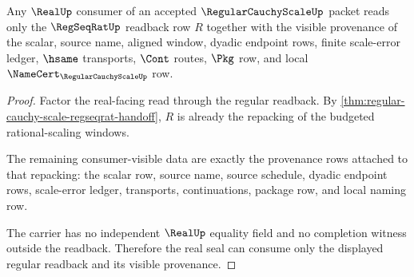 \begin{theorem}
\label{thm:regular-cauchy-scale-realup-seal-boundary}
Any $\RealUp$ consumer of an accepted $\RegularCauchyScaleUp$ packet reads only the $\RegSeqRatUp$ readback row $R$ together with the visible provenance of the scalar, source name, aligned window, dyadic endpoint rows, finite scale-error ledger, $\hsame$ transports, $\Cont$ routes, $\Pkg$ row, and local $\NameCert_{\RegularCauchyScaleUp}$ row.
\end{theorem}
\begin{proof}
Factor the real-facing read through the regular readback. By \autoref{thm:regular-cauchy-scale-regseqrat-handoff}, $R$ is already the repacking of the budgeted rational-scaling windows.

The remaining consumer-visible data are exactly the provenance rows attached to that repacking: the scalar row, source name, source schedule, dyadic endpoint rows, scale-error ledger, transports, continuations, package row, and local naming row.

The carrier has no independent $\RealUp$ equality field and no completion witness outside the readback. Therefore the real seal can consume only the displayed regular readback and its visible provenance.
\end{proof}

